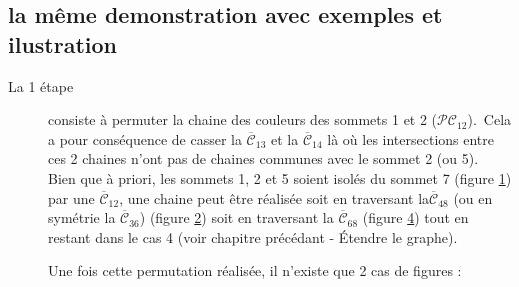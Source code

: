 \subsection{la même demonstration avec exemples et ilustration}
\begin{description}
\item[La 1 étape] consiste à permuter la chaine des couleurs des sommets 1 et 2 ($\mathcal{PC}_{12}$).\
Cela a pour conséquence de casser la $\overline{\mathcal{C}}_{13}$ et la $\overline{\mathcal{C}}_{14}$ là où les intersections entre ces 2 chaines n'ont pas de chaines communes avec le sommet 2 (ou 5).\\

Bien que à priori, les sommets 1, 2 et 5 soient isolés du sommet 7 (figure \ref{fig:cas4_etap1_1}) par une $\overline{\mathcal{C}}_{12}$, une chaine peut être réalisée soit en traversant la$\overline{\mathcal{C}}_{48}$ (ou en symétrie la $\overline{\mathcal{C}}_{36}$) (figure \ref{fig:cas4_etap1_2}) soit en traversant la $\overline{\mathcal{C}}_{68}$ (figure \ref{fig:cas4_etap1_3})  tout en restant dans le cas 4 (voir chapitre précédant - Étendre le graphe).
\FloatBarrier
\begin{figure}[!ht]\centering
	\begin{changemargin}{-5cm}{-3cm}
	\begin{center}
		\begin{subfigure}{0.4\textwidth}
			
			\caption{}\label{fig:cas4_etap1_1}
		\end{subfigure}
		\begin{subfigure}{0.3\textwidth}
			
			\caption{}\label{fig:cas4_etap1_2}
		\end{subfigure}
		\begin{subfigure}{0.1\textwidth}
			
			\caption{}\label{fig:cas4_etap1_3}
		\end{subfigure}
	\end{center}
	\caption{}
	\end{changemargin}
\end{figure}	
\FloatBarrier

Une fois cette permutation réalisée, il n'existe que 2 cas de figures : \\
\end{description}

